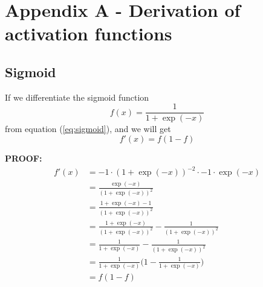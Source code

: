 \section{Appendix A - Derivation of activation functions} \label{sec:appendixa}

\subsection{Sigmoid}
If we differentiate the sigmoid function 
\begin{equation}
f(x)=\frac{1}{1+\exp(-x)}
\end{equation}
from equation (\ref{eq:sigmoid}), and we will get
\begin{equation}
f'(x)=f(1-f)
\end{equation}

\textbf{PROOF:}
\begin{align*}
f'(x) &= -1\cdot(1+\exp(-x))^{-2}\cdot -1\cdot\exp(-x)\\
&=\frac{\exp(-x)}{(1+\exp(-x))^{2}}\\
&=\frac{1+\exp(-x)-1}{(1+\exp(-x))^{2}}\\
&=\frac{1+\exp(-x)}{(1+\exp(-x))^{2}} - \frac{1}{(1+\exp(-x))^{2}}\\
&=\frac{1}{1+\exp(-x)} - \frac{1}{(1+\exp(-x))^{2}}\\
&=\frac{1}{1+\exp(-x)}\bigg(1 - \frac{1}{1+\exp(-x)}\bigg)\\
&=f(1-f)
\end{align*}